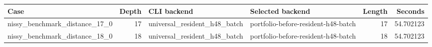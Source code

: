 {\small
\begin{tabular}{lrllrr}
\hline
Case & Depth & CLI backend & Selected backend & Length & Seconds \\
\hline
nissy\_benchmark\_distance\_17\_0 & 17 & universal\_resident\_h48\_batch & portfolio-before-resident-h48-batch & 17 & 54.702123 \\
nissy\_benchmark\_distance\_18\_0 & 18 & universal\_resident\_h48\_batch & portfolio-before-resident-h48-batch & 18 & 54.702123 \\
\hline
\end{tabular}
}
